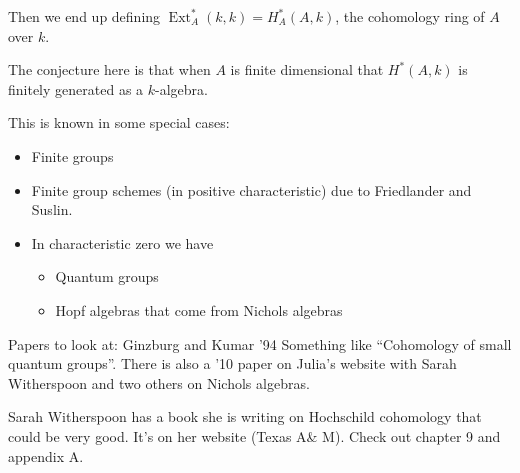 \documentclass[12pt]{article}
\theoremstyle{nonumberbreak}
\theoremstyle{changebreak}
\theoremstyle{nonumberplain}
\theoremstyle{change}
\DeclareMathOperator{\Ext}{Ext}
\begin{document}
Then we end up defining $\Ext_A^*(k,k)=H^*_A(A,k)$, the cohomology ring of $A$ over $k$.

The conjecture here is that when $A$ is finite dimensional that $H^*(A,k)$ is finitely generated as a $k$-algebra.

This is known in some special cases:
\begin{itemize}
	\item Finite groups
	\item Finite group schemes (in positive characteristic) due to Friedlander and Suslin.
	\item In characteristic zero we have
	\begin{itemize}
		\item Quantum groups
		\item Hopf algebras that come from Nichols algebras
	\end{itemize}
\end{itemize}

Papers to look at: Ginzburg and Kumar '94 Something like ``Cohomology of small quantum groups''. There is also a '10 paper on Julia's website with Sarah Witherspoon and two others on Nichols algebras.

Sarah Witherspoon has a book she is writing on Hochschild cohomology that could be very good. It's on her website (Texas A\& M). Check out chapter 9 and appendix A.
\end{document}
